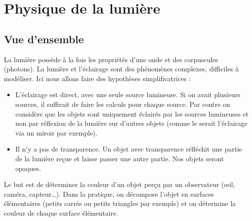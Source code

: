 \documentclass[11pt,class=report,crop=false]{standalone}
\begin{document}
\newcommand{\Cl}{\operatorname{\it Cl}}


%
%
%





\section{Physique de la lumière}

\subsection{Vue d'ensemble}

La lumière possède à la fois les propriétés d'une onde et des corpuscules (photons). La lumière et l'éclairage sont des phénomènes complexes, difficiles à modéliser. Ici nous allons faire des hypothèses simplificatrices :
\begin{itemize}
  \item L'éclairage est direct, avec une seule source lumineuse. Si on avait plusieurs sources, il suffirait de faire les calculs pour chaque source. Par contre on considère que les objets sont uniquement éclairés par les sources lumineuses et non par réflexion de la lumière sur d'autres objets (comme le serait l'éclairage via un miroir par exemple).

  \item Il n'y a pas de transparence. Un objet avec transparence réfléchit une partie de la lumière reçue et laisse passer une autre partie. Nos objets seront opaques.

\end{itemize}



Le but est de déterminer la couleur d'un objet perçu par un observateur (\oe{}il, caméra, capteur\ldots). Dans la pratique, on décompose l'objet en surfaces élémentaires (petits carrés ou petits triangles par exemple) et on détermine la couleur de chaque surface élémentaire.
\end{document}
